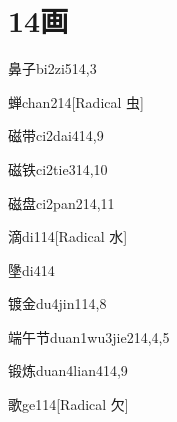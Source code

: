 
\section*{14画}

\begin{verbete}{鼻子}{bi2zi5}{14,3}
\end{verbete}

\begin{verbete}{蝉}{chan2}{14}[Radical 虫]
\end{verbete}

\begin{verbete}{磁带}{ci2dai4}{14,9}
\end{verbete}

\begin{verbete}{磁铁}{ci2tie3}{14,10}
\end{verbete}

\begin{verbete}{磁盘}{ci2pan2}{14,11}
\end{verbete}

\begin{verbete}{滴}{di1}{14}[Radical 水]
\end{verbete}

\begin{verbete}{墬}{di4}{14}
\end{verbete}

\begin{verbete}{镀金}{du4jin1}{14,8}
\end{verbete}

\begin{verbete}{端午节}{duan1wu3jie2}{14,4,5}
\end{verbete}

\begin{verbete}{锻炼}{duan4lian4}{14,9}
\end{verbete}

\begin{verbete}{歌}{ge1}{14}[Radical ⽋]
\end{verbete}

